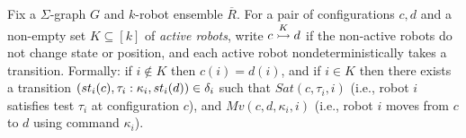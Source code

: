 Fix a $\Sigma$-graph $G$ and $k$-robot ensemble $\overline{R}$.
For a pair of configurations $c,d$ and a non-empty set $K \subseteq [k]$ of \emph{active robots}, write \emph{$\onestep{c}{d}{K}$}
if the non-active robots do not change state or position, and each active robot nondeterministically takes a transition. Formally: if $i \not\in K$ then
$c(i) = d(i)$, and if $i \in K$ then there exists a transition $(st_i(c),\gc{\tau_i}{\kappa_i},st_i(d)) \in \delta_i$ such that
$Sat(c,\tau_i,i)$ (i.e., robot $i$ satisfies test $\tau_i$ at configuration $c$), and
$Mv(c,d,\kappa_i,i)$ (i.e., robot $i$ moves from $c$ to $d$ using command $\kappa_i$).








